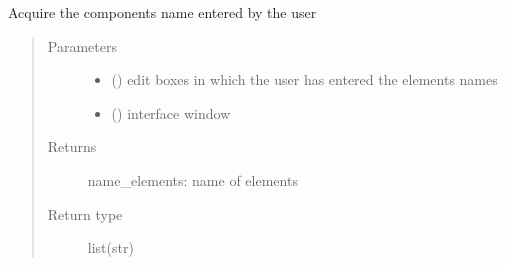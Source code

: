 \documentclass[letterpaper,10pt,english]{sphinxmanual}
\begin{document}
\begin{fulllineitems}
\label{\detokenize{ExperimentsPlannification:modules.get_elements}}
\sphinxAtStartPar
Acquire the components name entered by the user
\begin{quote}\begin{description}
\item[{Parameters}] \leavevmode\begin{itemize}
\item {} 
\sphinxAtStartPar
{} () \textendash{} edit boxes in which the user has entered the elements names

\item {} 
\sphinxAtStartPar
{} () \textendash{} interface window

\end{itemize}

\item[{Returns}] \leavevmode
\sphinxAtStartPar
name\_elements: name of elements

\item[{Return type}] \leavevmode
\sphinxAtStartPar
list(str)

\end{description}\end{quote}

\end{fulllineitems}

\label{\detokenize{ExperimentsPlannification:module-modules}}
\end{document}

